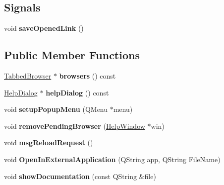 \subsection*{Signals}
\begin{DoxyCompactItemize}
\item 
\hypertarget{classMainWindow_a11dfe76fa2d143b5f5181b5f7102c789}{
void {\bfseries saveOpenedLink} ()}
\label{classMainWindow_a11dfe76fa2d143b5f5181b5f7102c789}

\end{DoxyCompactItemize}
\subsection*{Public Member Functions}
\begin{DoxyCompactItemize}
\item 
\hypertarget{classMainWindow_a58e1a9cfb454d8e035695cdcf849d00d}{
\hyperlink{classTabbedBrowser}{TabbedBrowser} $\ast$ {\bfseries browsers} () const }
\label{classMainWindow_a58e1a9cfb454d8e035695cdcf849d00d}

\item 
\hypertarget{classMainWindow_a2b369b8289d87b4ffa1a2709085df2e2}{
\hyperlink{classHelpDialog}{HelpDialog} $\ast$ {\bfseries helpDialog} () const }
\label{classMainWindow_a2b369b8289d87b4ffa1a2709085df2e2}

\item 
\hypertarget{classMainWindow_aa65ba793f20666b9716462694989835d}{
void {\bfseries setupPopupMenu} (QMenu $\ast$menu)}
\label{classMainWindow_aa65ba793f20666b9716462694989835d}

\item 
\hypertarget{classMainWindow_a372f961a71addeb6922f5b1f1a8e247a}{
void {\bfseries removePendingBrowser} (\hyperlink{classHelpWindow}{HelpWindow} $\ast$win)}
\label{classMainWindow_a372f961a71addeb6922f5b1f1a8e247a}

\item 
\hypertarget{classMainWindow_a97fe619b1868cca441f82170de500901}{
void {\bfseries msgReloadRequest} ()}
\label{classMainWindow_a97fe619b1868cca441f82170de500901}

\item 
\hypertarget{classMainWindow_aeae18fdcfb92714898fe859288a8ded1}{
void {\bfseries OpenInExternalApplication} (QString app, QString FileName)}
\label{classMainWindow_aeae18fdcfb92714898fe859288a8ded1}

\item 
\hypertarget{classMainWindow_adf5ea0c6a98e9f944bcbd105c110ccd1}{
void {\bfseries showDocumentation} (const QString \&file)}
\label{classMainWindow_adf5ea0c6a98e9f944bcbd105c110ccd1}

\end{DoxyCompactItemize}
